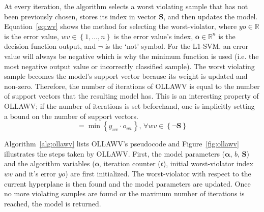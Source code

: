 \documentclass[reqno]{vcuthesis}
\newcommand{\set}[1]{{\left\{#1\right\}}}
\newcommand{\reals}{{\mathbb{R}}}
\numberwithin{equation}{chapter}
\begin{document}
At every iteration, the algorithm selects a worst violating sample that has not been previously chosen, stores its index in vector $\bm S$, and then updates the model. Equation~\ref{eq:wv} shows the method for selecting the worst-violator, where $yo \in \reals$ is the error value, $wv \in \set{1, \ldots, n}$ is the error value's index, $\bm o \in \reals^n$ is the decision function output, and $\neg$ is the `not' symbol. For the L1-SVM, an error value will always be negative which is why the minimum function is used (i.e. the most negative output value or incorrectly classified sample). The worst violating sample becomes the model's support vector because its weight is updated and non-zero. Therefore, the number of iterations of OLLAWV is equal to the number of support vectors that the resulting model has. This is an interesting property of OLLAWV; if the number of iterations is set beforehand, one is implicitly setting a bound on the number of support vectors. 
\begin{equation}
[yo, wv] = \min \set{y_{wv} \cdot o_{wv}},\, \forall wv \in \set{\neg \bm S}
\label{eq:wv}
\end{equation}

Algorithm~\ref{alg:ollawv} lists OLLAWV's pseudocode and Figure~\ref{fig:ollawv} illustrates the steps taken by OLLAWV. First, the model parameters ($\bm \alpha$, $b$, $\bm S$) and the algorithm variables ($\bm o$, iteration counter ($t$), initial worst-violator index $wv$ and it's error $yo$) are first initialized. The worst-violator with respect to the current hyperplane is then found and the model parameters are updated. Once no more violating samples are found or the maximum number of iterations is reached, the model is returned.
\end{document}
